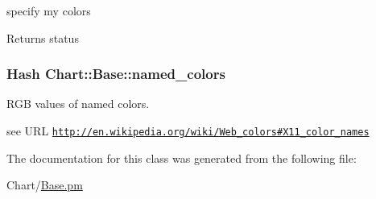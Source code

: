 specify my colors 

\begin{DoxyReturn}{Returns}
status 
\end{DoxyReturn}
\hypertarget{classChart_1_1Base_a38c2792df08724efa7c4e1b9194cbe6e}{
\subsubsection[{named\_\-colors}]{\setlength{\rightskip}{0pt plus 5cm}Hash {\bf Chart::Base::named\_\-colors}}}
\label{classChart_1_1Base_a38c2792df08724efa7c4e1b9194cbe6e}


RGB values of named colors. 

see URL \href{http://en.wikipedia.org/wiki/Web_colors#X11_color_names}{\tt http://en.wikipedia.org/wiki/Web\_\-colors\#X11\_\-color\_\-names} 

The documentation for this class was generated from the following file:\begin{DoxyCompactItemize}
\item 
Chart/\hyperlink{Base_8pm}{Base.pm}\end{DoxyCompactItemize}
